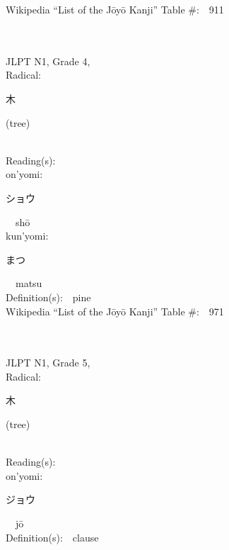 \begin{multicols}{2}
Wikipedia ``List of the J\=oy\=o Kanji'' Table \#:\ \ 911 \\
\ \ \\
{\fontsize{34pt}{40pt}  }\ \ \\  %
{JLPT N1, Grade 4, \\Radical:\ \ {\begin{CJK}{UTF8}{min} 木 \end{CJK}} (tree) } \\
Reading(s):\ \ \\
{\hspace*{1em}}on'yomi:\ \ \\
{\hspace*{2em}}{\begin{CJK}{UTF8}{min} ショウ \end{CJK}}\ \ sh\=o\ \ \\
{\hspace*{1em}}kun'yomi:\ \ \\
{\hspace*{2em}}{\begin{CJK}{UTF8}{min} まつ \end{CJK}}\ \ matsu\ \ \\
Definition(s):\ \ pine \\
Wikipedia ``List of the J\=oy\=o Kanji'' Table \#:\ \ 971 \\
\ \ \\
{\fontsize{34pt}{40pt}  }\ \ \\  %
{JLPT N1, Grade 5, \\Radical:\ \ {\begin{CJK}{UTF8}{min} 木 \end{CJK}} (tree) } \\
Reading(s):\ \ \\
{\hspace*{1em}}on'yomi:\ \ \\
{\hspace*{2em}}{\begin{CJK}{UTF8}{min} ジョウ \end{CJK}}\ \ j\=o\ \ \\
Definition(s):\ \ clause \\

\end{multicols}
